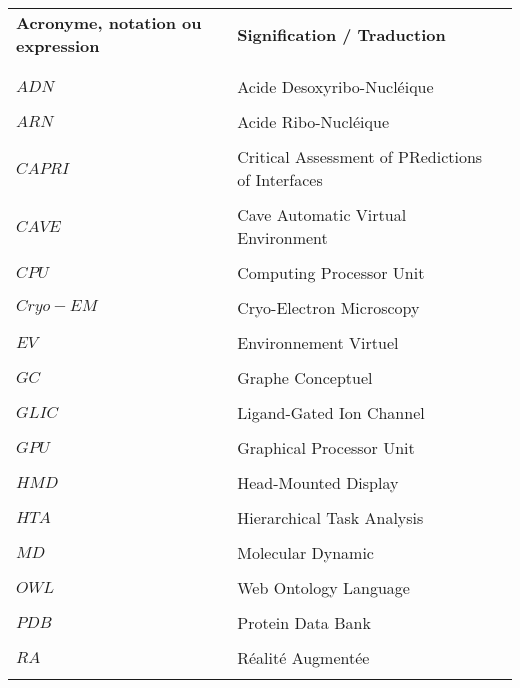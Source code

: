 


\begin{table}[htbp]
\centering
\begin{tabular}{l l l}

\textbf{Acronyme, notation ou expression} & \textbf{Signification / Traduction} & \\ \\ %
\hline
\\
$ADN$ & Acide Desoxyribo-Nucléique & \\  \\
$ARN$ & Acide Ribo-Nucléique & \\  \\
$CAPRI$ & Critical Assessment of PRedictions of Interfaces & \\  \\
$CAVE$ & Cave Automatic Virtual Environment & \\  \\
$CPU$ & Computing Processor Unit & \\  \\
$Cryo-EM$ & Cryo-Electron Microscopy & \\  \\
$EV$ & Environnement Virtuel \\  \\
$GC$ & Graphe Conceptuel & \\  \\
$GLIC$ & Ligand-Gated Ion Channel & \\  \\ 
$GPU$ & Graphical Processor Unit & \\  \\
$HMD$ & Head-Mounted Display \\  \\
$HTA$ & Hierarchical Task Analysis \\  \\
$MD$ & Molecular Dynamic & \\  \\
$OWL$ & Web Ontology Language & \\  \\
$PDB$ & Protein Data Bank & \\  \\
$RA$ & Réalité Augmentée & \\  \\

\end{tabular}
\end{table}
